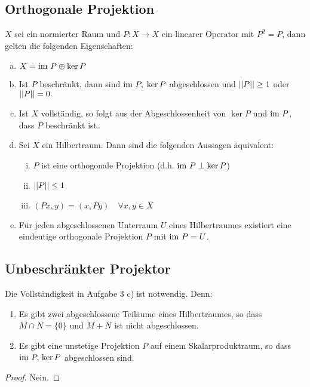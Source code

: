 \documentclass[FunkAnaSkriptSS2017.tex]{subfiles} %
\begin{document}
\subsection{ Orthogonale Projektion}
	$X$ sei ein normierter Raum und $P: X \to X$ ein linearer Operator mit $P^2 = P$, dann gelten die folgenden Eigenschaften:
	\begin{enumerate}[(a)]
		\item $X = \textnormal{im } P \oplus \ker P$
		\item Ist $P$ beschränkt, dann sind $\textnormal{im } P,\; \ker P$ abgeschlossen und $\left\lvert \left\lvert  P  \right\rvert \right\rvert \geq 1$ oder $\left\lvert \left\lvert  P  \right\rvert \right\rvert = 0.$
		\item Ist $X$ vollständig, so folgt aus der Abgeschlossenheit von $\ker P$ und $\textnormal{im } P$, dass $P$ beschränkt ist.
		\item Sei $X$ ein Hilbertraum. Dann sind die folgenden Aussagen äquivalent: 
		\begin{enumerate}[(i)]
			\item $P$ ist eine orthogonale Projektion (d.h. $\textnormal{im } P \perp \ker P$)
			\item $\left\lvert \left\lvert  P  \right\rvert \right\rvert \leq 1$
			
			\item $(Px, y) = (x, Py) \quad  \forall x,y \in X$
		\end{enumerate}
		\item Für jeden abgeschlossenen Unterraum $U$ eines Hilbertraumes existiert eine eindeutige orthogonale Projektion $P$ mit $\textnormal{im } P = U$.
	\end{enumerate}
	
\subsection{ Unbeschränkter Projektor}
	Die Vollständigkeit in Aufgabe 3 c) ist notwendig. Denn:
	\begin{enumerate}
		\item Es gibt zwei abgeschlossene Teiläume eines Hilbertraumes, so dass $M \cap N = \{0 \}$ und $M+N$ ist nicht abgeschlossen.
		\item Es gibt eine unstetige Projektion $P$ auf einem Skalarproduktraum, so dass $\textnormal{im } P,\, \ker P$ abgeschlossen sind.
	\end{enumerate}

	\begin{proof}
	Nein.
	\end{proof}



\newpage
\end{document}
